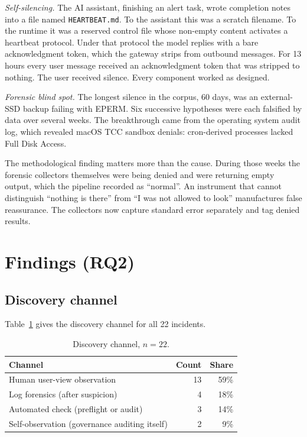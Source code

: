 \documentclass[conference]{IEEEtran}
\begin{document}
\emph{Self-silencing.} The AI assistant, finishing an alert task, wrote
completion notes into a file named \texttt{HEARTBEAT.md}. To the assistant
this was a scratch filename. To the runtime it was a reserved control file
whose non-empty content activates a heartbeat protocol. Under that protocol
the model replies with a bare acknowledgment token, which the gateway strips
from outbound messages. For 13 hours every user message received an
acknowledgment token that was stripped to nothing. The user received
silence. Every component worked as designed.

\emph{Forensic blind spot.} The longest silence in the corpus, 60 days, was
an external-SSD backup failing with EPERM. Six successive hypotheses were
each falsified by data over several weeks. The breakthrough came from the
operating system audit log, which revealed macOS TCC sandbox denials:
cron-derived processes lacked Full Disk Access.

The methodological finding matters more than the cause. During those weeks
the forensic collectors themselves were being denied and were returning
empty output, which the pipeline recorded as ``normal''. An instrument that
cannot distinguish ``nothing is there'' from ``I was not allowed to look''
manufactures false reassurance. The collectors now capture standard error
separately and tag denied results.

\section{Findings (RQ2)}
\label{sec:findings}

\subsection{Discovery channel}

Table~\ref{tab:discovery} gives the discovery channel for all 22 incidents.

\begin{table}[t]
\caption{Discovery channel, $n = 22$.}
\label{tab:discovery}
\centering
\footnotesize
\begin{tabular}{@{}l r r@{}}
\toprule
Channel & Count & Share \\
\midrule
Human user-view observation & 13 & 59\% \\
Log forensics (after suspicion) & 4 & 18\% \\
Automated check (preflight or audit) & 3 & 14\% \\
Self-observation (governance auditing itself) & 2 & 9\% \\
\bottomrule
\end{tabular}
\end{table}
\end{document}

